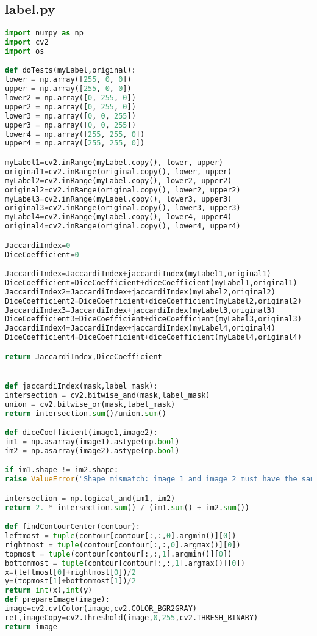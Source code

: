 \documentclass[12pt]{article}
\begin{document}
\subsection{label.py}
\begin{lstlisting}[language=Python]
import numpy as np
import cv2
import os

def doTests(myLabel,original):
lower = np.array([255, 0, 0])
upper = np.array([255, 0, 0])
lower2 = np.array([0, 255, 0])
upper2 = np.array([0, 255, 0])
lower3 = np.array([0, 0, 255])
upper3 = np.array([0, 0, 255])
lower4 = np.array([255, 255, 0])
upper4 = np.array([255, 255, 0])

myLabel1=cv2.inRange(myLabel.copy(), lower, upper)
original1=cv2.inRange(original.copy(), lower, upper)
myLabel2=cv2.inRange(myLabel.copy(), lower2, upper2)
original2=cv2.inRange(original.copy(), lower2, upper2)
myLabel3=cv2.inRange(myLabel.copy(), lower3, upper3)
original3=cv2.inRange(original.copy(), lower3, upper3)
myLabel4=cv2.inRange(myLabel.copy(), lower4, upper4)
original4=cv2.inRange(original.copy(), lower4, upper4)

JaccardiIndex=0
DiceCoefficient=0

JaccardiIndex=JaccardiIndex+jaccardiIndex(myLabel1,original1)
DiceCoefficient=DiceCoefficient+diceCoefficient(myLabel1,original1)
JaccardiIndex2=JaccardiIndex+jaccardiIndex(myLabel2,original2)
DiceCoefficient2=DiceCoefficient+diceCoefficient(myLabel2,original2)
JaccardiIndex3=JaccardiIndex+jaccardiIndex(myLabel3,original3)
DiceCoefficient3=DiceCoefficient+diceCoefficient(myLabel3,original3)
JaccardiIndex4=JaccardiIndex+jaccardiIndex(myLabel4,original4)
DiceCoefficient4=DiceCoefficient+diceCoefficient(myLabel4,original4)

return JaccardiIndex,DiceCoefficient


def jaccardiIndex(mask,label_mask):
intersection = cv2.bitwise_and(mask,label_mask)
union = cv2.bitwise_or(mask,label_mask)
return intersection.sum()/union.sum()

def diceCoefficient(image1,image2):
im1 = np.asarray(image1).astype(np.bool)
im2 = np.asarray(image2).astype(np.bool)

if im1.shape != im2.shape:
raise ValueError("Shape mismatch: image 1 and image 2 must have the same shape.")

intersection = np.logical_and(im1, im2)
return 2. * intersection.sum() / (im1.sum() + im2.sum())

def findContourCenter(contour):
leftmost = tuple(contour[contour[:,:,0].argmin()][0])
rightmost = tuple(contour[contour[:,:,0].argmax()][0])
topmost = tuple(contour[contour[:,:,1].argmin()][0])
bottommost = tuple(contour[contour[:,:,1].argmax()][0])
x=(leftmost[0]+rightmost[0])/2
y=(topmost[1]+bottommost[1])/2
return int(x),int(y)
def prepareImage(image):
image=cv2.cvtColor(image,cv2.COLOR_BGR2GRAY)
ret,imageCopy=cv2.threshold(image,0,255,cv2.THRESH_BINARY)
return image


\end{lstlisting}
\end{document}
